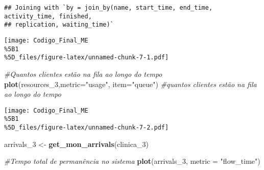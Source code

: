 \documentclass[
]{article}
\newenvironment{Shaded}{\begin{snugshade}}{\end{snugshade}}
\newcommand{\AttributeTok}[1]{\textcolor[rgb]{0.13,0.29,0.53}{#1}}
\newcommand{\CommentTok}[1]{\textcolor[rgb]{0.56,0.35,0.01}{\textit{#1}}}
\newcommand{\FunctionTok}[1]{\textcolor[rgb]{0.13,0.29,0.53}{\textbf{#1}}}
\newcommand{\NormalTok}[1]{#1}
\newcommand{\OtherTok}[1]{\textcolor[rgb]{0.56,0.35,0.01}{#1}}
\newcommand{\SpecialCharTok}[1]{\textcolor[rgb]{0.81,0.36,0.00}{\textbf{#1}}}
\newcommand{\StringTok}[1]{\textcolor[rgb]{0.31,0.60,0.02}{#1}}
\begin{document}
\begin{verbatim}
## Joining with `by = join_by(name, start_time, end_time, activity_time, finished,
## replication, waiting_time)`
\end{verbatim}

\begin{Shaded}
\end{Shaded}

\texttt{[image: Codigo\_Final\_ME\\\%5B1\\\%5D\_files/figure-latex/unnamed-chunk-7-1.pdf]}

\begin{Shaded}
\begin{Highlighting}[]
\CommentTok{\#Quantos clientes estão na fila ao longo do tempo}
\FunctionTok{plot}\NormalTok{(resources\_3,}\AttributeTok{metric=}\StringTok{"usage"}\NormalTok{, }\AttributeTok{item=}\StringTok{"queue"}\NormalTok{) }\CommentTok{\#quantos clientes estão na fila ao longo do tempo}
\end{Highlighting}
\end{Shaded}

\texttt{[image: Codigo\_Final\_ME\\\%5B1\\\%5D\_files/figure-latex/unnamed-chunk-7-2.pdf]}

\begin{Shaded}
\begin{Highlighting}[]
\NormalTok{arrivals\_3 }\OtherTok{\textless{}{-}} \FunctionTok{get\_mon\_arrivals}\NormalTok{(clinica\_3)}

\CommentTok{\#Tempo total de permanência no sistema}
\FunctionTok{plot}\NormalTok{(arrivals\_3, }\AttributeTok{metric =} \StringTok{"flow\_time"}\NormalTok{)  }
\end{Highlighting}
\end{Shaded}
\end{document}
